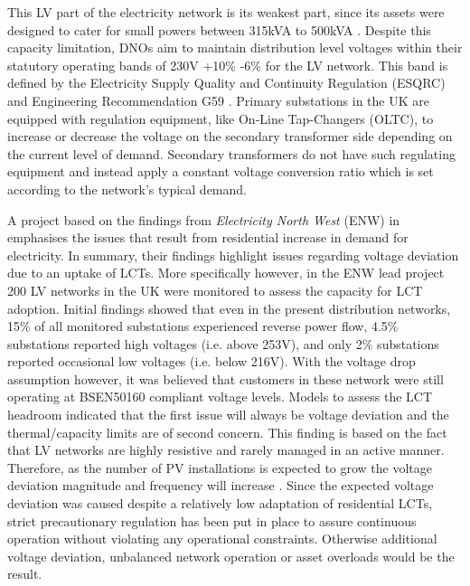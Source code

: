 This LV part of the electricity network is its weakest part, since its assets were designed to cater for small powers between 315kVA to 500kVA \cite{EDS08-0115}.
Despite this capacity limitation, DNOs aim to maintain distribution level voltages within their statutory operating bands of 230V +10\% -6\% for the LV network.
This band is defined by the Electricity Supply Quality and Continuity Regulation (ESQRC) \cite{HealthandSafetyExecutive2002} and Engineering Recommendation G59 \cite{EnergyNetworksAssociation2013}.
Primary substations in the UK are equipped with regulation equipment, like On-Line Tap-Changers (OLTC), to increase or decrease the voltage on the secondary transformer side depending on the current level of demand.
Secondary transformers do not have such regulating equipment and instead apply a constant voltage conversion ratio which is set according to the network's typical demand.

A project based on the findings from \textit{Electricity North West} (ENW) in \cite{ElectricityNorthWestLtd2014} emphasises the issues that result from residential increase in demand for electricity.
In summary, their findings highlight issues regarding voltage deviation due to an uptake of LCTs.
More specifically however, in the ENW lead project 200 LV networks in the UK were monitored to assess the capacity for LCT adoption.
Initial findings showed that even in the present distribution networks, 15\% of all monitored substations experienced reverse power flow, 4.5\% substations reported high voltages (i.e. above 253V), and only 2\% substations reported occasional low voltages (i.e. below 216V).
With the voltage drop assumption however, it was believed that customers in these network were still operating at BSEN50160 compliant voltage levels.
Models to assess the LCT headroom indicated that the first issue will always be voltage deviation and the thermal/capacity limits are of second concern.
This finding is based on the fact that LV networks are highly resistive and rarely managed in an active manner.
Therefore, as the number of PV installations is expected to grow the voltage deviation magnitude and frequency will increase \cite{Woyte2006}.
Since the expected voltage deviation was caused despite a relatively low adaptation of residential LCTs, strict precautionary regulation has been put in place to assure continuous operation without violating any operational constraints.
Otherwise additional voltage deviation, unbalanced network operation or asset overloads would be the result.

